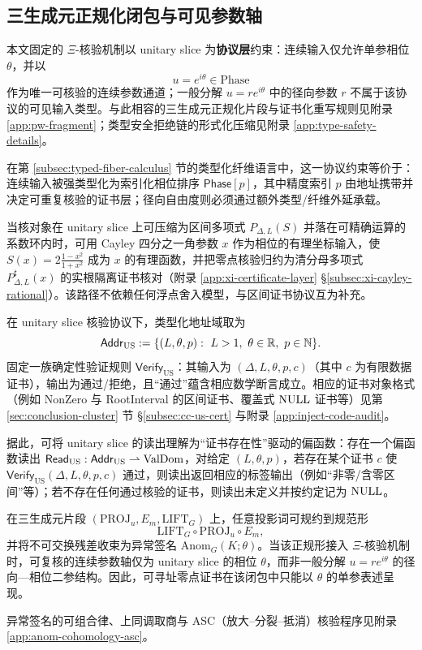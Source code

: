 \subsection{三生成元正规化闭包与可见参数轴}
\begin{definition}\label{def:unitary-slice-audit-axis}
本文固定的 $\Xi$-核验机制以 unitary slice 为\textbf{协议层}约束：连续输入仅允许单参相位 $\theta$，并以
$$
u=e^{i\theta}\in\mathrm{Phase}
$$
作为唯一可核验的连续参数通道；一般分解 $u=re^{i\theta}$ 中的径向参数 $r$ 不属于该协议的可见输入类型。与此相容的三生成元正规化片段与证书化重写规则见附录 \ref{app:pw-fragment}；类型安全拒绝链的形式化压缩见附录 \ref{app:type-safety-details}。
\par
在第 \ref{subsec:typed-fiber-calculus} 节的类型化纤维语言中，这一协议约束等价于：连续输入被强类型化为索引化相位排序 $\mathsf{Phase}[p]$，其中精度索引 $p$ 由地址携带并决定可重复核验的证书层；径向自由度则必须通过额外类型/纤维外延承载。
\end{definition}

\begin{remark}\label{rem:us-rational-audit}
当核对象在 unitary slice 上可压缩为区间多项式 $P_{\Delta,L}(S)$ 并落在可精确运算的系数环内时，可用 Cayley 四分之一角参数 $x$ 作为相位的有理坐标输入，使
$
S(x)=2\frac{1-x^2}{1+x^2}
$
成为 $x$ 的有理函数，并把零点核验归约为清分母多项式 $P_{\Delta,L}^\sharp(x)$ 的实根隔离证书核对（附录 \ref{app:xi-certificate-layer} \S\ref{subsec:xi-cayley-rational}）。该路径不依赖任何浮点舍入模型，与区间证书协议互为补充。
\end{remark}

\begin{definition}\label{def:us-typed-address-null}
在 unitary slice 核验协议下，类型化地址域取为
$$
\Addr_{\mathrm{US}}:=\{(L,\theta,p):\ L>1,\ \theta\in\RR,\ p\in\NN\}.
$$
固定一族确定性验证规则 $\mathsf{Verify}_{\mathrm{US}}$：其输入为 $(\Delta,L,\theta,p,c)$（其中 $c$ 为有限数据证书），输出为通过/拒绝，且“通过”蕴含相应数学断言成立。相应的证书对象格式（例如 NonZero 与 RootInterval 的区间证书、覆盖式 $\mathrm{NULL}$ 证书等）见第 \ref{sec:conclusion-cluster} 节 \S\ref{subsec:cc-us-cert} 与附录 \ref{app:inject-code-audit}。\par
据此，可将 unitary slice 的读出理解为“证书存在性”驱动的偏函数：存在一个偏函数读出 $\mathsf{Read}_{\mathrm{US}}:\mathsf{Addr}_{\mathrm{US}}\rightharpoonup \mathrm{ValDom}$，对给定 $(L,\theta,p)$，若存在某个证书 $c$ 使 $\mathsf{Verify}_{\mathrm{US}}(\Delta,L,\theta,p,c)$ 通过，则读出返回相应的标签输出（例如“非零/含零区间”等）；若不存在任何通过核验的证书，则读出未定义并按约定记为 $\mathrm{NULL}$。
\end{definition}
在三生成元片段 $(\mathrm{PROJ}_u,E_m,\mathrm{LIFT}_G)$ 上，任意投影词可规约到规范形
$$
\mathrm{LIFT}_G\circ \mathrm{PROJ}_u\circ E_m,
$$
并将不可交换残差收束为异常签名 $\mathrm{Anom}_G(K;\theta)$。当该正规形接入 $\Xi$-核验机制时，可复核的连续参数轴仅为 unitary slice 的相位 $\theta$，而非一般分解 $u=re^{i\theta}$ 的径向—相位二参结构。因此，可寻址零点证书在该闭包中只能以 $\theta$ 的单参表述呈现。

异常签名的可组合律、上同调取商与 ASC（放大--分裂--抵消）核验程序见附录 \ref{app:anom-cohomology-asc}。

